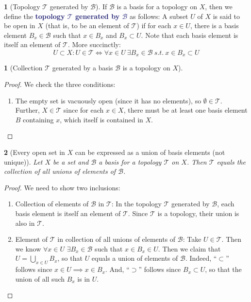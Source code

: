 \documentclass[11pt]{article}
\numberwithin{equation}{section}
\newcommand{\navy}[1]{\textcolor{MidnightBlue}{\bf #1}}
\theoremstyle{plain}
\newtheorem{theorem}{\color{ForestGreen}{\textbf{Theorem}}}[section]
\newtheorem{lemma}[theorem]{\color{ForestGreen}{\textbf{Lemma}}}
\theoremstyle{definition}
\newtheorem{definition}{\color{MidnightBlue}{\textbf{Definition}}}[section]
\def\ss{\subset}
\newcommand{\1}{\mathbbm 1}
\newcommand{\tT}{\mathcal T}
\newcommand{\bB}{\mathcal B}
\begin{document}
\begin{definition}[Topology $\tT$ generated by $\bB$]
	If $\bB$ is a basis for a topology on $X$, then we define the \navy{topology $\tT$ generated by $\bB$} as follows: A subset $U$ of $X$ is said to be open in $X$ (that is, to be an element of $\tT$) if for each $x \in U$, there is a basis element $B_x \in \bB$ such that $x \in B_x$ and $B_x \subset U$. Note that each basis element is itself an element of $\tT$. More succinctly:
	\begin{equation*}
		U \ss X: U \in \tT \iff \forall x\in U \ \exists B_x \in \bB \ s.t. \ x \in B_x \ss U
	\end{equation*}
	
\end{definition}

\begin{theorem}[Collection $\tT$ generated by a basis $\bB$ is a topology on $X$]
\end{theorem}
\begin{proof}
	We check the three conditions:
	\begin{enumerate}
		\item The empty set is vacuously open (since it has no elements), so $\emptyset \in \tT$. Further, $X \in \tT$ since for each $x \in X$, there must be at least one basis element $B$ containing $x$, which itself is contained in $X$. 
	\end{enumerate}
\end{proof}

\begin{lemma}[Every open set in $X$ can be expressed as a union of basis elements (not unique)]
	Let $X$ be a set and $\bB$ a basis for a topology $\tT$ on $X$. Then $\tT$ equals the collection of all unions of elements of $\bB$. 
\end{lemma}
\begin{proof}
	We need to show two inclusions:
	\begin{enumerate}
		\item Collection of elements of $\bB$ in $\tT$: In the topology $\tT$ generated by $\bB$, each basis element is itself an element of $\tT$. Since $\tT$ is a topology, their union is also in $\tT$. 
		\item Element of $\tT$ in collection of all unions of elements of $\bB$: Take $U \in \tT$. Then we know $\forall x \in U$ $\exists B_x \in \bB$ such that $x \in B_x \in U$. Then we claim that $U = \bigcup_{x \in U} B_x$, so that $U$ equals a union of elements of $\bB$. Indeed, ``$\ss$'' follows since $x \in U \implies x \in B_x$. And, ``$\supset$'' follows since $B_x \ss U$, so that the union of all such $B_x$ is in $U$.  
	\end{enumerate}
\end{proof}
\end{document}
